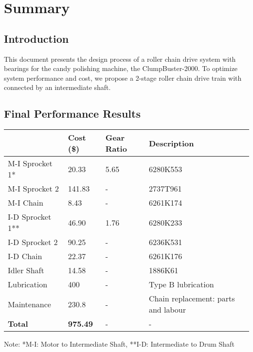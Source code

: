 \documentclass[letterpaper,12pt]{article}
\begin{document}
\section{Summary}
\subsection{Introduction}
This document presents the design process of a roller chain drive system with bearings for the candy polishing machine, the ClumpBuster-2000. To optimize system performance and cost, we propose a 2-stage roller chain drive train with connected by an intermediate shaft.

\subsection{Final Performance Results}
\begin{center}
	\begin{tabular}{ |p{3cm}||p{2cm}|p{2cm}|p{7cm}|  }
		\hline
		 & Cost (\$) & Gear Ratio & Description \\
		\hline
		M-I Sprocket 1* &20.33 & 5.65 & 6280K553 \\
		M-I Sprocket 2 &141.83 & - & 2737T961 \\
		M-I Chain & 8.43 & - & 6261K174 \\
		I-D Sprocket 1** & 46.90 & 1.76 & 6280K233 \\
		I-D Sprocket 2 & 90.25 & - & 6236K531 \\
		I-D Chain & 22.37 & - & 6261K176 \\
		Idler Shaft &14.58 & - & 1886K61\\
		\hline
		\hline
		Lubrication & 400&- & Type B lubrication\\
		\hline
		\hline
		Maintenance & 230.8& - & Chain replacement: parts and labour\\
		\hline
		\hline
		\textbf{Total} & \textbf{975.49}& - & - \\
		\hline
	\end{tabular}
\end{center}
\noindent Note: *M-I: Motor to Intermediate Shaft, **I-D: Intermediate to Drum Shaft
\end{document}
